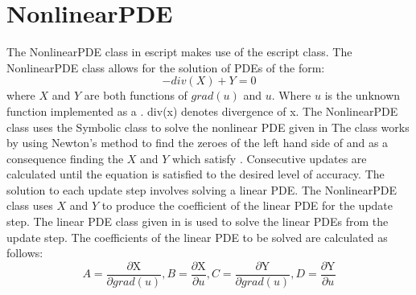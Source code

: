 \section{NonlinearPDE}
The NonlinearPDE class in escript makes use of the escript \SYMBOL class. The NonlinearPDE class allows for the solution of PDEs of the form:
\begin{equation}
-div(X) + Y = 0
\label{symbolic eq1}
\end{equation}
where $X$ and $Y$ are both functions of $grad(u)$ and $u$. Where $u$ is the unknown function implemented as a \SYMBOL. div(x) denotes divergence of x.
The NonlinearPDE class uses the Symbolic class to solve the nonlinear PDE given in 
The class works by using Newton's method to find the zeroes of the left hand side of  and as a consequence finding the
$X$ and $Y$ which satisfy . 
Consecutive updates are calculated until the equation is
satisfied to the desired level of accuracy. The solution to each update step involves solving a linear PDE. The NonlinearPDE class uses $X$ and $Y$ to produce the coefficient of the linear PDE for the update step. The linear PDE class given in  is used to solve the linear PDEs from the update step. The coefficients of the linear PDE to be solved are calculated as follows: 
\begin{equation*}
 A = \frac{\partial \text{X}}{\partial grad(u)},   B = \frac{\partial \text{X}}{\partial u},   C = \frac{\partial \text{Y}}{\partial grad(u)},    D = \frac{\partial \text{Y}}{\partial u}
\end{equation*}
